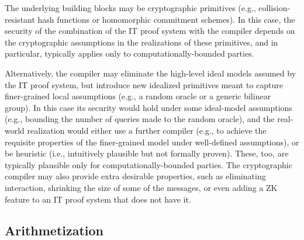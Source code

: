The underlying building blocks may be cryptographic primitives (e.g., collision-resistant hash functions or homomorphic commitment schemes).
In this case, the security of the combination of the IT proof system with the compiler depends on the cryptographic assumptions in the realizations of these primitives, and in particular, typically applies only to computationally-bounded parties.
\loosen

Alternatively, the compiler may eliminate the high-level ideal models assumed by the IT proof system, but introduce new idealized primitives meant to capture finer-grained local assumptions (e.g., a random oracle or a generic bilinear group).
In this case its security would hold under some ideal-model assumptions (e.g., bounding the number of queries made to the random oracle), and the real-world realization would either use a further compiler (e.g., to achieve the requisite properties of the finer-grained model under well-defined assumptions), or be heuristic (i.e., intuitively plausible but not formally proven).
These, too, are typically plausible only for computationally-bounded parties.
The cryptographic compiler may also provide extra desirable properties, such as eliminating interaction, shrinking the size of some of the messages, or even adding a ZK feature to an IT proof system that does not have it.


\vspace{-.6em}
\subsection{Arithmetization}
\label{par:paradigms:background:arithmetization}

\vspace{-.5em}

